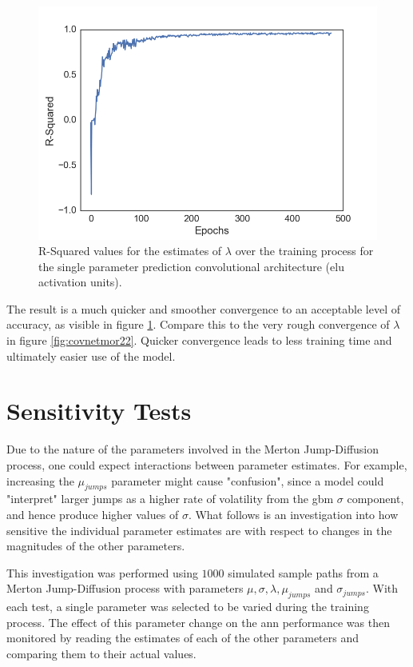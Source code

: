 \documentclass[11pt,oneside,openany,a4paper,english, report, goldenblock
]{usthesis}
\begin{document}
\begin{figure}[h]
	\centering
	\includegraphics[width=0.5\linewidth]{Images/Prediction-Convergence/ConvolutionalNN-SingleOutput/Lambda-RSquared}
	\caption[R-Squared values for the predictions of $\lambda$ over the training process for the single parameter prediction convolutional architecture (\acrshort{elu} activation units).]{R-Squared values for the estimates of $\lambda$ over the training process for the single parameter prediction convolutional architecture (\acrshort{elu} activation units).}
	\label{fig:lambda-rsquared}
\end{figure}

The result is a much quicker and smoother convergence to an acceptable level of accuracy, as visible in figure \ref{fig:lambda-rsquared}. Compare this to the very rough convergence of $\lambda$ in figure \ref{fig:covnetmor22}. Quicker convergence leads to less training time and ultimately easier use of the model.

\section{Sensitivity Tests}
Due to the nature of the parameters involved in the Merton Jump-Diffusion process, one could expect interactions between parameter estimates. For example, increasing the $\mu_{jumps}$ parameter might cause "confusion", since a model could "interpret" larger jumps as a higher rate of volatility from the \acrshort{gbm} $\sigma$ component, and hence produce higher values of $\sigma$. What follows is an investigation into how sensitive the individual parameter estimates are with respect to changes in the magnitudes of the other parameters. 

This investigation was performed using $1000$ simulated sample paths from a Merton Jump-Diffusion process with parameters $\mu, \sigma, \lambda, \mu_{jumps}$ and $\sigma_{jumps}$. With each test, a single parameter was selected to be varied during the training process. The effect of this parameter change on the \acrshort{ann} performance was then monitored by reading the estimates of each of the other parameters and comparing them to their actual values.
\end{document}
